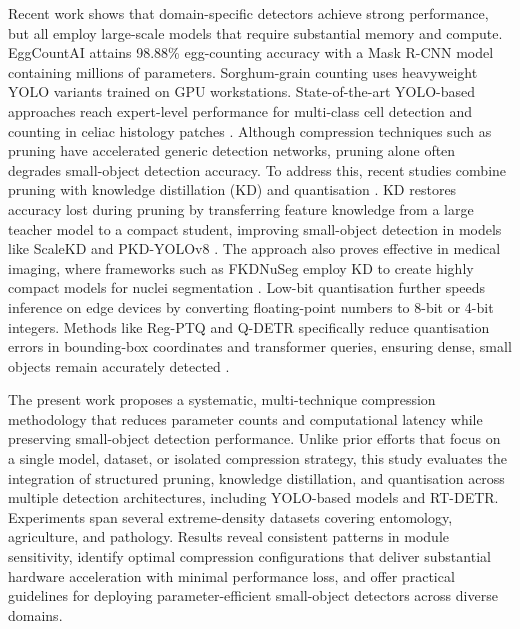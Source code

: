 \begin{sloppypar}
Recent work shows that domain-specific detectors achieve strong performance, but all employ large-scale models that require substantial memory and compute. EggCountAI \cite{Javed2023} attains 98.88\% egg-counting accuracy with a Mask R-CNN model containing millions of parameters. Sorghum-grain counting \cite{Bakshi2025,Freeman2023,Santiago2024} uses heavyweight YOLO variants trained on GPU workstations. State-of-the-art YOLO-based approaches reach expert-level performance for multi-class cell detection and counting in celiac histology patches \cite{Tyagi2023}. Although compression techniques \cite{Endrawati2021,Wei2018} such as pruning have accelerated generic detection networks, pruning alone often degrades small-object detection accuracy. To address this, recent studies combine pruning with knowledge distillation (KD) and quantisation \cite{Yu2025_PKD}. KD restores accuracy lost during pruning by transferring feature knowledge from a large teacher model to a compact student, improving small-object detection in models like ScaleKD \cite{zhu2023scalekd} and PKD-YOLOv8 \cite{Yu2025_PKD}. The approach also proves effective in medical imaging, where frameworks such as FKDNuSeg employ KD to create highly compact models for nuclei segmentation \cite{Zhao2026_FKDNuSeg}. Low-bit quantisation further speeds inference on edge devices by converting floating-point numbers to 8-bit or 4-bit integers. Methods like Reg-PTQ \cite{ding2024regptq} and Q-DETR \cite{xu2023qdetr} specifically reduce quantisation errors in bounding-box coordinates and transformer queries, ensuring dense, small objects remain accurately detected \cite{ding2024regptq, xu2023qdetr}.
\end{sloppypar}

The present work proposes a systematic, multi-technique compression methodology that reduces parameter counts and computational latency while preserving small-object detection performance. Unlike prior efforts that focus on a single model, dataset, or isolated compression strategy, this study evaluates the integration of structured pruning, knowledge distillation, and quantisation across multiple detection architectures, including YOLO-based models and RT-DETR. Experiments span several extreme-density datasets covering entomology, agriculture, and pathology. Results reveal consistent patterns in module sensitivity, identify optimal compression configurations that deliver substantial hardware acceleration with minimal performance loss, and offer practical guidelines for deploying parameter-efficient small-object detectors across diverse domains.

